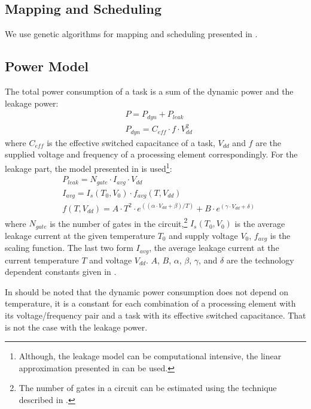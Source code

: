 \subsection{Mapping and Scheduling}
We use genetic algorithms for mapping and scheduling presented in \cite{schmitz2004}.

\subsection{Power Model}
The total power consumption of a task is a sum of the dynamic power and the leakage power:
\begin{align*}
  & P = P_{dyn} + P_{leak} \\
  & P_{dyn} = C_{eff} \cdot f \cdot V_{dd}^2
\end{align*}
where $C_{eff}$ is the effective switched capacitance of a task, $V_{dd}$ and $f$ are the supplied voltage and frequency of a processing element correspondingly. For the leakage part, the model presented in \cite{liao2005} is used\footnote{Although, the leakage model can be computational intensive, the linear approximation presented in \cite{liu2007} can be used.}:
\begin{align*}
  & P_{leak} = N_{gate} \cdot I_{avg} \cdot V_{dd} \\
  & I_{avg} = I_s(T_0, V_0) \cdot f_{avg}(T, V_{dd}) \\
  & f(T, V_{dd}) = A \cdot T^2 \cdot e^{((\alpha \cdot V_{dd} + \beta)/T)} + B \cdot e^{(\gamma \cdot V_{dd} + \delta)}
\end{align*}
where $N_{gate}$ is the number of gates in the circuit,\footnote{The number of gates in a circuit can be estimated using the technique described in \cite{li2004}.} $I_s (T_0, V_0)$ is the average leakage current at the given temperature $T_0$ and supply voltage $V_0$, $f_{avg}$ is the scaling function. The last two form $I_{avg}$, the average leakage current at the current temperature $T$ and voltage $V_{dd}$. $A$, $B$, $\alpha$, $\beta$, $\gamma$, and $\delta$ are the technology dependent constants given in \cite{liao2005}.

In should be noted that the dynamic power consumption does not depend on temperature, it is a constant for each combination of a processing element with its voltage/frequency pair and a task with its effective switched capacitance. That is not the case with the leakage power.

